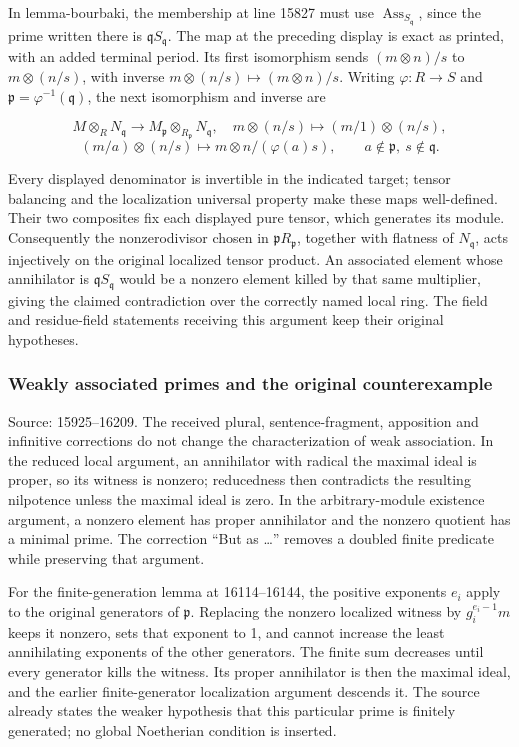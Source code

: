 In lemma-bourbaki, the membership at line 15827 must use \(\operatorname{Ass}_{S_{\mathfrak q}}\), since the prime written there is \(\mathfrak qS_{\mathfrak q}\). The map at the preceding display is exact as printed, with an added terminal period. Its first isomorphism sends \((m\otimes n)/s\) to \(m\otimes(n/s)\), with inverse \(m\otimes(n/s)\mapsto(m\otimes n)/s\). Writing \(\varphi:R\to S\) and \(\mathfrak p=\varphi^{-1}(\mathfrak q)\), the next isomorphism and inverse are

\[
M\otimes_RN_{\mathfrak q}\longrightarrow
 M_{\mathfrak p}\otimes_{R_{\mathfrak p}}N_{\mathfrak q},
\quad m\otimes(n/s)\longmapsto(m/1)\otimes(n/s),
\] \[
(m/a)\otimes(n/s)\longmapsto m\otimes n/(\varphi(a)s),
\qquad a\notin\mathfrak p,\ s\notin\mathfrak q.
\]

Every displayed denominator is invertible in the indicated target; tensor balancing and the localization universal property make these maps well-defined. Their two composites fix each displayed pure tensor, which generates its module. Consequently the nonzerodivisor chosen in \(\mathfrak pR_{\mathfrak p}\), together with flatness of \(N_{\mathfrak q}\), acts injectively on the original localized tensor product. An associated element whose annihilator is \(\mathfrak qS_{\mathfrak q}\) would be a nonzero element killed by that same multiplier, giving the claimed contradiction over the correctly named local ring. The field and residue-field statements receiving this argument keep their original hypotheses.

\subsubsection{Weakly associated primes and the original counterexample}\label{algebra-proof-005-weakly-associated-primes-and-the-original-counterexample}

Source: 15925--16209. The received plural, sentence-fragment, apposition and infinitive corrections do not change the characterization of weak association. In the reduced local argument, an annihilator with radical the maximal ideal is proper, so its witness is nonzero; reducedness then contradicts the resulting nilpotence unless the maximal ideal is zero. In the arbitrary-module existence argument, a nonzero element has proper annihilator and the nonzero quotient has a minimal prime. The correction ``But as \ldots'' removes a doubled finite predicate while preserving that argument.

For the finite-generation lemma at 16114--16144, the positive exponents \(e_i\) apply to the original generators of \(\mathfrak p\). Replacing the nonzero localized witness by \(g_i^{e_i-1}m\) keeps it nonzero, sets that exponent to 1, and cannot increase the least annihilating exponents of the other generators. The finite sum decreases until every generator kills the witness. Its proper annihilator is then the maximal ideal, and the earlier finite-generator localization argument descends it. The source already states the weaker hypothesis that this particular prime is finitely generated; no global Noetherian condition is inserted.

